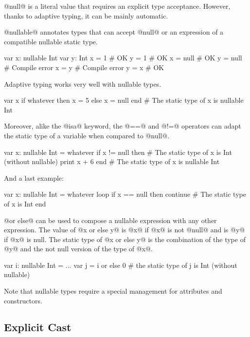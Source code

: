 @null@ is a literal value that requires an explicit type acceptance.
However, thanks to adaptive typing, it can be mainly automatic.

@nullable@ annotates types that can accept @null@ or an expression of a compatible nullable static type.

\begin{lst}
var x: nullable Int
var y: Int
x = 1 # OK
y = 1 # OK
x = null # OK
y = null # Compile error
x = y # Compile error
y = x # OK
\end{lst}

Adaptive typing works very well with nullable types.

\begin{lst}
var x
if whatever then
	x = 5
else
	x = null
end
# The static type of x is nullable Int
\end{lst}

Moreover, alike the @isa@ keyword, the @==@ and @!=@ operators can adapt the static type of a variable when compared to @null@.

\begin{lst}
var x: nullable Int = whatever
if x != null then
	# The static type of x is Int (without nullable)
	print x + 6
end
# The static type of x is nullable Int
\end{lst}

And a last example:
\begin{lst}
var x: nullable Int = whatever
loop
	if x == null then continue
	# The static type of x is Int
end
\end{lst}

@or else@ can be used to compose a nullable expression with any other expression.
The value of @x or else y@ is @x@ if @x@ is not @null@ and is @y@ if @x@ is null.
The static type of @x or else y@ is the combination of the type of @y@ and the not null version of the type of @x@.
\begin{lst}
var i: nullable Int = ...
var j = i or else 0
# the static type of j is Int (without nullable)
\end{lst}

Note that nullable types require a special management for attributes and constructors.

\subsection{Explicit Cast}\label{as}


